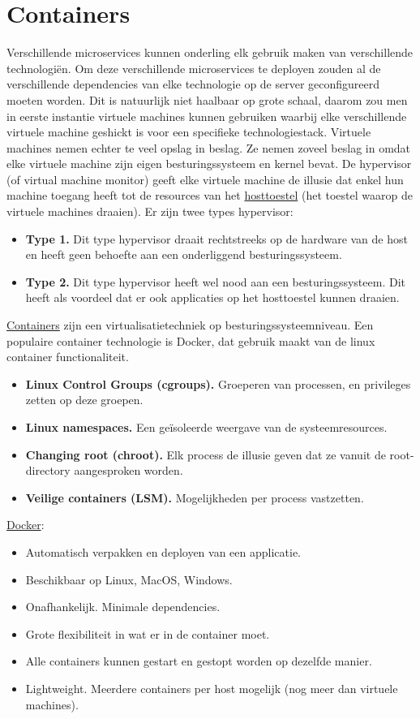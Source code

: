 	\chapter{Containers}
	Verschillende microservices kunnen onderling elk gebruik maken van verschillende technologiën. Om deze verschillende microservices te deployen zouden al de verschillende dependencies van elke technologie op de server geconfigureerd moeten worden. Dit is natuurlijk niet haalbaar op grote schaal, daarom zou men in eerste instantie virtuele machines kunnen gebruiken waarbij elke verschillende virtuele machine geshickt is voor een specifieke technologiestack. Virtuele machines nemen echter te veel opslag in beslag. Ze nemen zoveel beslag in omdat elke virtuele machine zijn eigen besturingssysteem en kernel bevat. De hypervisor (of virtual machine monitor) geeft elke virtuele machine de illusie dat enkel hun machine toegang heeft tot de resources van het \underline{hosttoestel} (het toestel waarop de virtuele machines draaien). 
	Er zijn twee types hypervisor:
	\begin{itemize}
		\item[\info]\textbf{Type 1.} Dit type hypervisor draait rechtstreeks op de hardware van de host en heeft geen behoefte aan een onderliggend besturingssysteem. 
		\item[\info]\textbf{Type 2.} Dit type hypervisor heeft wel nood aan een besturingssysteem. Dit heeft als voordeel dat er ook applicaties op het hosttoestel kunnen draaien.
	\end{itemize}
	\underline{Containers} zijn een virtualisatietechniek op besturingssysteemniveau. Een populaire container technologie is Docker, dat gebruik maakt van de linux container functionaliteit.  
	\begin{itemize}
		\item[\info]\textbf{Linux Control Groups (cgroups).} Groeperen van processen, en privileges zetten op deze groepen.
		\item[\info]\textbf{Linux namespaces.} Een geïsoleerde weergave van de systeemresources.
		\item[\info]\textbf{Changing root (chroot).} Elk process de illusie geven dat ze vanuit de root-directory aangesproken worden.
		\item[\info]\textbf{Veilige containers (LSM).} Mogelijkheden per process vastzetten.
	\end{itemize}

	\underline{Docker}:
	\begin{itemize}
		\item[\info]Automatisch verpakken en deployen van een applicatie.
		\item[\info]Beschikbaar op Linux, MacOS, Windows.
		\item[\info]Onafhankelijk. Minimale dependencies.
		\item[\info]Grote flexibiliteit in wat er in de container moet.
		\item[\info]Alle containers kunnen gestart en gestopt worden op dezelfde manier.
		\item[\info]Lightweight. Meerdere containers per host mogelijk (nog meer dan virtuele machines).
	\end{itemize}

